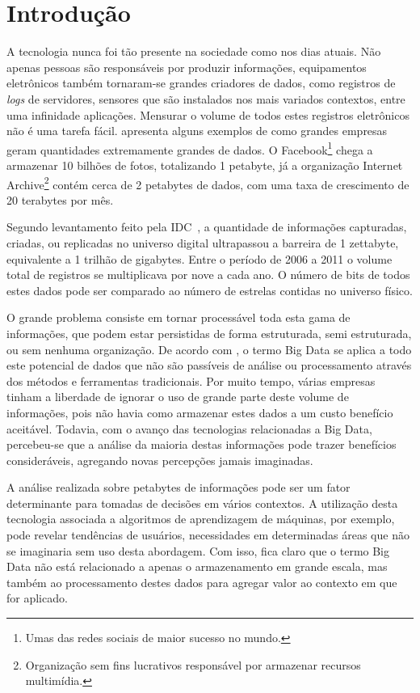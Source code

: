 \chapter{Introdução}
 
A tecnologia nunca foi tão presente na sociedade como nos dias atuais. Não apenas pessoas são responsáveis por produzir informações, equipamentos eletrônicos também tornaram-se grandes criadores de dados, como registros de \textit{logs} de servidores, sensores que são instalados nos mais variados contextos, entre uma infinidade aplicações. Mensurar o volume de todos estes registros eletrônicos não é uma tarefa fácil.  apresenta alguns exemplos de como grandes empresas geram quantidades extremamente grandes de dados. O Facebook\footnote{Umas das redes sociais de maior sucesso no mundo.} chega a armazenar 10 bilhões de fotos, totalizando 1 petabyte, já a organização Internet Archive\footnote{Organização sem fins lucrativos responsável por armazenar recursos multimídia.} contém cerca de 2 petabytes de dados, com uma taxa de crescimento de 20 terabytes por mês.

Segundo levantamento feito pela IDC~\cite{gantz2011}, a quantidade de informações capturadas, criadas, ou replicadas no universo digital ultrapassou a barreira de 1 zettabyte, equivalente a 1 trilhão de gigabytes. Entre o período de 2006 a 2011 o volume total de registros se multiplicava por nove a cada ano. O número de bits de todos estes dados pode ser comparado ao número de estrelas contidas no universo físico.

O grande problema consiste em tornar processável toda esta gama de informações, que podem estar persistidas de forma estruturada, semi estruturada, ou sem nenhuma organização. De acordo com , o termo Big Data se aplica a todo este potencial de dados que não são passíveis de análise ou processamento através dos métodos e ferramentas tradicionais. Por muito tempo, várias empresas tinham a liberdade de ignorar o uso de grande parte deste volume de informações, pois não havia como armazenar estes dados a um custo benefício aceitável. Todavia, com o avanço das tecnologias relacionadas a Big Data, percebeu-se que a análise da maioria destas informações pode trazer benefícios consideráveis, agregando novas percepções jamais imaginadas.

A análise realizada sobre petabytes de informações pode ser um fator determinante para tomadas de decisões em vários contextos. A utilização desta tecnologia associada a algoritmos de aprendizagem de máquinas, por exemplo, pode revelar tendências de usuários, necessidades em determinadas áreas que não se imaginaria sem uso desta abordagem. Com isso, fica claro que o termo Big Data não está relacionado a apenas o armazenamento em grande escala, mas também ao processamento destes dados para agregar valor ao contexto em que for aplicado.

